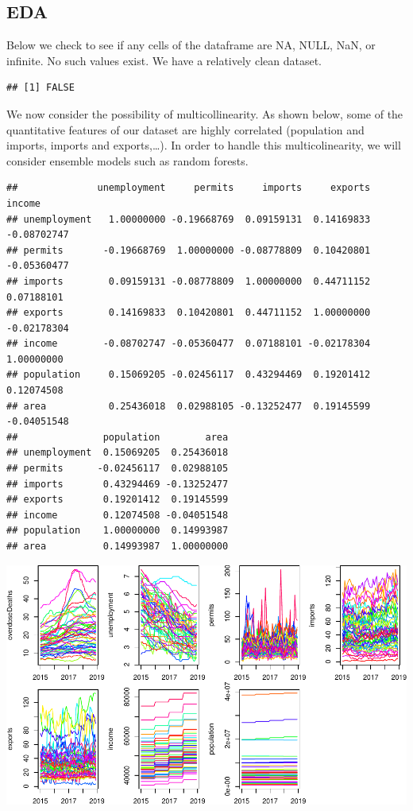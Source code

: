 \documentclass[]{article}
\begin{document}
\subsection{EDA}

Below we check to see if any cells of the dataframe are NA, NULL, NaN,
or infinite. No such values exist. We have a relatively clean dataset.

\begin{verbatim}
## [1] FALSE
\end{verbatim}

We now consider the possibility of multicollinearity. As shown below,
some of the quantitative features of our dataset are highly correlated
(population and imports, imports and exports,\ldots{}). In order to
handle this multicolinearity, we will consider ensemble models such as
random forests.

\begin{verbatim}
##              unemployment     permits     imports     exports      income
## unemployment   1.00000000 -0.19668769  0.09159131  0.14169833 -0.08702747
## permits       -0.19668769  1.00000000 -0.08778809  0.10420801 -0.05360477
## imports        0.09159131 -0.08778809  1.00000000  0.44711152  0.07188101
## exports        0.14169833  0.10420801  0.44711152  1.00000000 -0.02178304
## income        -0.08702747 -0.05360477  0.07188101 -0.02178304  1.00000000
## population     0.15069205 -0.02456117  0.43294469  0.19201412  0.12074508
## area           0.25436018  0.02988105 -0.13252477  0.19145599 -0.04051548
##               population        area
## unemployment  0.15069205  0.25436018
## permits      -0.02456117  0.02988105
## imports       0.43294469 -0.13252477
## exports       0.19201412  0.19145599
## income        0.12074508 -0.04051548
## population    1.00000000  0.14993987
## area          0.14993987  1.00000000
\end{verbatim}

\begin{center}\includegraphics{stat139_project_final_files/figure-latex/toy-1} \end{center}
\end{document}
